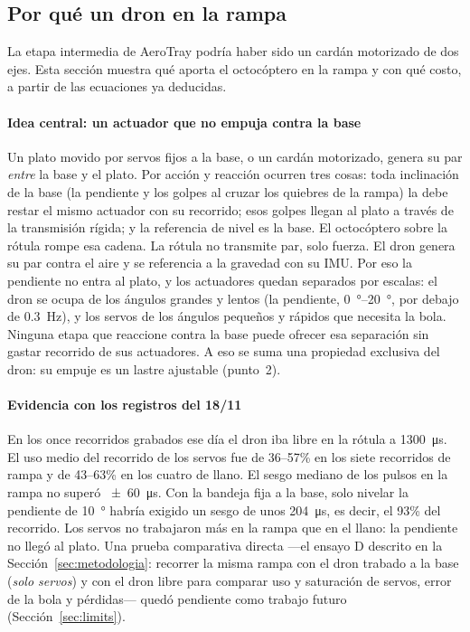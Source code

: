\subsection{Por qué un dron en la rampa}
\label{sec:porquedron}

La etapa intermedia de AeroTray podría haber sido un cardán motorizado de dos ejes. Esta sección muestra qué aporta el octocóptero en la rampa y con qué costo, a partir de las ecuaciones ya deducidas.

\paragraph{Idea central: un actuador que no empuja contra la base}
Un plato movido por servos fijos a la base, o un cardán motorizado, genera su par \emph{entre} la base y el plato. Por acción y reacción ocurren tres cosas: toda inclinación de la base (la pendiente y los golpes al cruzar los quiebres de la rampa) la debe restar el mismo actuador con su recorrido; esos golpes llegan al plato a través de la transmisión rígida; y la referencia de nivel es la base. El octocóptero sobre la rótula rompe esa cadena. La rótula no transmite par, solo fuerza. El dron genera su par contra el aire y se referencia a la gravedad con su IMU. Por eso la pendiente no entra al plato, y los actuadores quedan separados por escalas: el dron se ocupa de los ángulos grandes y lentos (la pendiente, \SIrange{0}{20}{\degree}, por debajo de \SI{0.3}{\hertz}), y los servos de los ángulos pequeños y rápidos que necesita la bola. Ninguna etapa que reaccione contra la base puede ofrecer esa separación sin gastar recorrido de sus actuadores. A eso se suma una propiedad exclusiva del dron: su empuje es un lastre ajustable (punto~2).

\paragraph{Evidencia con los registros del 18/11}
En los once recorridos grabados ese día el dron iba libre en la rótula a \SI{1300}{\micro\second}. El uso medio del recorrido de los servos fue de 36--57\% en los siete recorridos de rampa y de 43--63\% en los cuatro de llano. El sesgo mediano de los pulsos en la rampa no superó \SI{\pm60}{\micro\second}. Con la bandeja fija a la base, solo nivelar la pendiente de \SI{10}{\degree} habría exigido un sesgo de unos \SI{204}{\micro\second}, es decir, el 93\% del recorrido. Los servos no trabajaron más en la rampa que en el llano: la pendiente no llegó al plato. Una prueba comparativa directa —el ensayo D descrito en la Sección~\ref{sec:metodologia}: recorrer la misma rampa con el dron trabado a la base (\emph{solo servos}) y con el dron libre para comparar uso y saturación de servos, error de la bola y pérdidas— quedó pendiente como trabajo futuro (Sección~\ref{sec:limits}).

